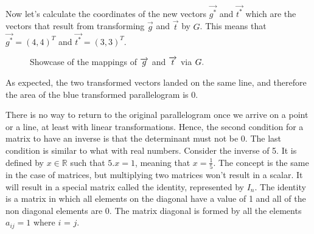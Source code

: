 \documentclass[600paper, 11pt,twoside,openany]{kdp}
\begin{document}
\indent Now let’s calculate the coordinates of the new vectors $\overrightarrow{g^*}$ and $\overrightarrow{t^*}$ which are the vectors that result from transforming $\overrightarrow{g}$ and $\overrightarrow{t}$ by $G$. This means that $\overrightarrow{g^*} = (4,4)^T$ and $\overrightarrow{t^*} = (3,3)^T$.
\newpage
\begin{figure}[h!]
\begin{center}
\end{center}
\caption{Showcase of the mappings of $\protect\overrightarrow{g}$ and $\protect\overrightarrow{t}$ via $\protect G.$}
\end{figure}

\indent As expected, the two transformed vectors landed on the same line, and therefore the area of the blue transformed parallelogram is 0.\par 
\vspace{-3pt}
\indent There is no way to return to the original parallelogram once we arrive on a point or a line, at least with linear transformations. Hence, the second condition for a matrix to have an inverse is that the determinant must not be 0. The last condition is similar to what with real numbers. Consider the inverse of 5. It is defined by $x \in \mathbb{R}$ such that $5.x=1$, meaning that $x = \frac{1}{5}$. The concept is the same in the case of matrices, but multiplying two matrices won’t result in a scalar. It will result in a special matrix called the identity, represented by $I_n$. The identity is a matrix in which all elements on the diagonal have a value of 1 and all of the non diagonal elements are 0. The matrix diagonal is formed by all the elements $a_{ij} = 1$ where $i$ = $j$.
\end{document}
